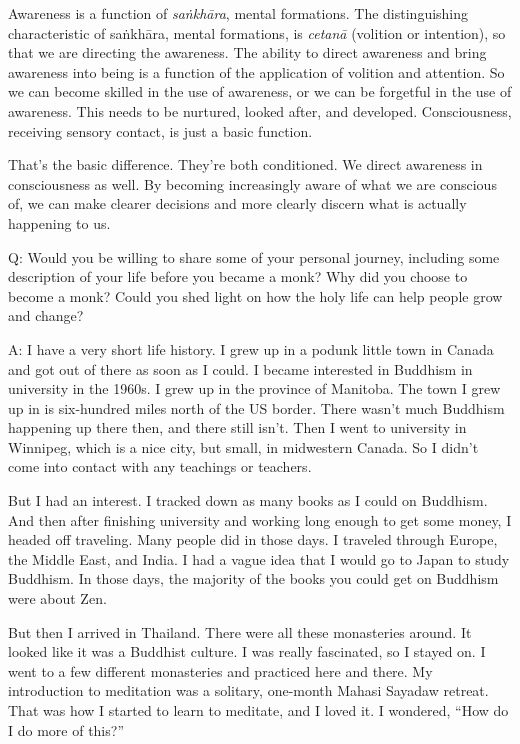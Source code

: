 Awareness is a function of \emph{saṅkhāra}, mental formations. The
distinguishing characteristic of saṅkhāra, mental formations, is
\emph{cetanā} (volition or intention), so that we are directing the
awareness. The ability to direct awareness and bring awareness into
being is a function of the application of volition and attention. So we
can become skilled in the use of awareness, or we can be forgetful in
the use of awareness. This needs to be nurtured, looked after, and
developed. Consciousness, receiving sensory contact, is just a basic
function.

That’s the basic difference. They’re both conditioned. We direct
awareness in consciousness as well. By becoming increasingly aware of
what we are conscious of, we can make clearer decisions and more clearly
discern what is actually happening to us.

\vspace{\the\qaskip}
Q: Would you be willing to share some of your personal journey,
including some description of your life before you became a monk? Why
did you choose to become a monk? Could you shed light on how the holy
life can help people grow and change?

\vspace{\the\qaskip}
A: I have a very short life history. I grew up in a podunk little town
in Canada and got out of there as soon as I could. I became interested
in Buddhism in university in the 1960s. I grew up in the province of
Manitoba. The town I grew up in is six-hundred miles north of the US
border. There wasn’t much Buddhism happening up there then, and there
still isn’t. Then I went to university in Winnipeg, which is a nice
city, but small, in midwestern Canada. So I didn’t come into contact
with any teachings or teachers.

But I had an interest. I tracked down as many books as I could on
Buddhism. And then after finishing university and working long enough to
get some money, I headed off traveling. Many people did in those days. I
traveled through Europe, the Middle East, and India. I had a vague idea
that I would go to Japan to study Buddhism. In those days, the majority
of the books you could get on Buddhism were about Zen.

But then I arrived in Thailand. There were all these monasteries around.
It looked like it was a Buddhist culture. I was really fascinated, so I
stayed on. I went to a few different monasteries and practiced here and
there. My introduction to meditation was a solitary, one-month Mahasi
Sayadaw retreat. That was how I started to learn to meditate, and I
loved it. I wondered, “How do I do more of this?”

